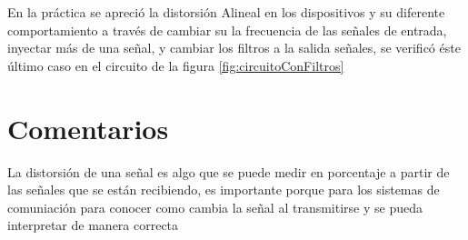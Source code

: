 \documentclass{article}
\begin{document}
En la práctica se apreció la distorsión Alineal en los dispositivos y su diferente comportamiento a través de cambiar su la frecuencia de las señales de entrada, inyectar más de una señal, y cambiar los filtros a la salida señales, se verificó éste último caso en el circuito de la figura \ref{fig:circuitoConFiltros}\\


\section{Comentarios}

La distorsión de una señal es algo que se puede medir en porcentaje a partir de las señales que se están recibiendo, es importante porque para los sistemas de comuniación para conocer como cambia la señal al transmitirse y se pueda interpretar de manera correcta





\end{document}
